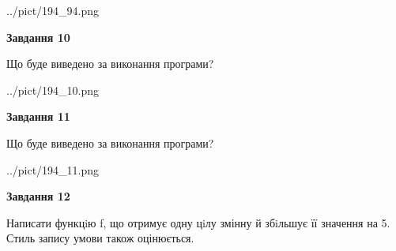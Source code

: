 \documentclass[12pt, ukrainian]{article}
\begin{document}
{\begin {large}
\begin{center}
	{../pict/194_94.png}
\end{center}
\newpage

{\begin {center}\textbf{Завдання 10}\end {center}}

Що буде виведено за виконання програми?\par
\begin{center}
	{../pict/194_10.png}
\end{center}
\newpage

{\begin {center}\textbf{Завдання 11}\end {center}}

Що буде виведено за виконання програми?\par
\begin{center}
	{../pict/194_11.png}
\end{center}
\newpage

{\begin {center}\textbf{Завдання 12}\end {center}}


Написати функцiю f, що отримує одну цiлу змінну й збiльшує її значення на 5. Стиль запису умови також оцінюється.\par
\newpage

\end {large}}
\end{document}
